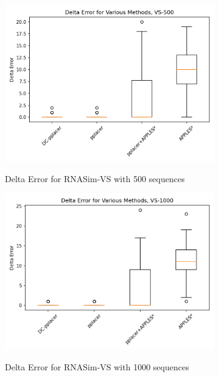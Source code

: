 \documentclass[10pt]{article}
\begin{document}
\begin{figure}[h]
\begin{subfigure}{0.5\textwidth}
\centering
\includegraphics[width=\textwidth]{Figs/VS-delta-error-500.png}
\label{fig:error500}
\caption{Delta Error for RNASim-VS with 500 sequences}
\end{subfigure}
\begin{subfigure}{0.5\textwidth}
\centering
\includegraphics[width=\textwidth]{Figs/VS-delta-error-1000.png}
\label{fig:error1000}
\caption{Delta Error for RNASim-VS with 1000 sequences}
\end{subfigure}\\
\begin{subfigure}{0.5\textwidth}

\end{subfigure}
\end{figure}
\end{document}
